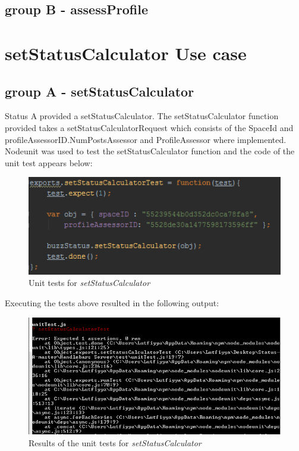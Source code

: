 \documentclass[a4paper,12pt]{article}
\begin{document}
\subsection{group B - assessProfile}



\newpage
\section{setStatusCalculator Use case}
\subsection{group A - setStatusCalculator}
Status A provided a setStatusCalculator. 
The setStatusCalculator function provided takes a setStatusCalculatorRequest which consists of the SpaceId and profileAssessorID.NumPostsAssessor and ProfileAssessor where implemented.
Nodeunit was used to test the setStatusCalculator function and the code of the unit test appears below:

\begin{figure}[H]
		\centering
		\includegraphics[width=1.0\textwidth]{Figures/setStatusCalculator.png}
		\caption{Unit tests for \textit{setStatusCalculator}}
	\end{figure}

Executing the tests above resulted in the following output:

	\begin{figure}[H]
		\centering
		\includegraphics[width=1.0\textwidth]{Figures/setStatusCalculatorOutput.png}
		\caption{Results of the unit tests for \textit{setStatusCalculator}}
	\end{figure}
	
\end{document}
